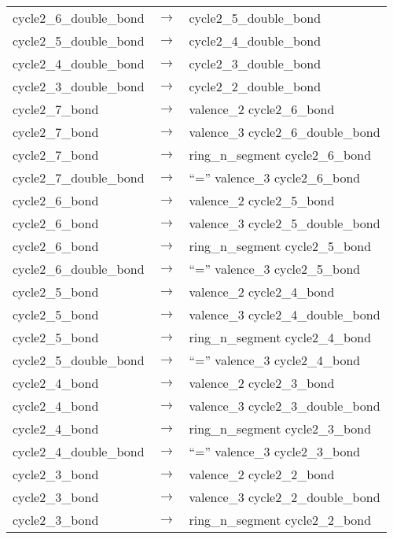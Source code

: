 \documentclass[../Document.tex]{subfiles}
\begin{document}
\begin{longtable}{m{} p{} p{}}
    cycle2\_6\_double\_bond & $\rightarrow$ & cycle2\_5\_double\_bond \\
    cycle2\_5\_double\_bond & $\rightarrow$ & cycle2\_4\_double\_bond \\
    cycle2\_4\_double\_bond & $\rightarrow$ & cycle2\_3\_double\_bond \\
    cycle2\_3\_double\_bond & $\rightarrow$ & cycle2\_2\_double\_bond \\
    cycle2\_7\_bond & $\rightarrow$ & valence\_2 cycle2\_6\_bond \\
    cycle2\_7\_bond & $\rightarrow$ & valence\_3 cycle2\_6\_double\_bond \\
    cycle2\_7\_bond & $\rightarrow$ & ring\_n\_segment cycle2\_6\_bond \\
    cycle2\_7\_double\_bond & $\rightarrow$ & ``='' valence\_3 cycle2\_6\_bond \\
    cycle2\_6\_bond & $\rightarrow$ & valence\_2 cycle2\_5\_bond \\
    cycle2\_6\_bond & $\rightarrow$ & valence\_3 cycle2\_5\_double\_bond \\
    cycle2\_6\_bond & $\rightarrow$ & ring\_n\_segment cycle2\_5\_bond \\
    cycle2\_6\_double\_bond & $\rightarrow$ & ``='' valence\_3 cycle2\_5\_bond \\
    cycle2\_5\_bond & $\rightarrow$ & valence\_2 cycle2\_4\_bond \\
    cycle2\_5\_bond & $\rightarrow$ & valence\_3 cycle2\_4\_double\_bond \\
    cycle2\_5\_bond & $\rightarrow$ & ring\_n\_segment cycle2\_4\_bond \\
    cycle2\_5\_double\_bond & $\rightarrow$ & ``='' valence\_3 cycle2\_4\_bond \\
    cycle2\_4\_bond & $\rightarrow$ & valence\_2 cycle2\_3\_bond \\
    cycle2\_4\_bond & $\rightarrow$ & valence\_3 cycle2\_3\_double\_bond \\
    cycle2\_4\_bond & $\rightarrow$ & ring\_n\_segment cycle2\_3\_bond \\
    cycle2\_4\_double\_bond & $\rightarrow$ & ``='' valence\_3 cycle2\_3\_bond \\
    cycle2\_3\_bond & $\rightarrow$ & valence\_2 cycle2\_2\_bond \\
    cycle2\_3\_bond & $\rightarrow$ & valence\_3 cycle2\_2\_double\_bond \\
    cycle2\_3\_bond & $\rightarrow$ & ring\_n\_segment cycle2\_2\_bond \\

\end{longtable}
\end{document}
